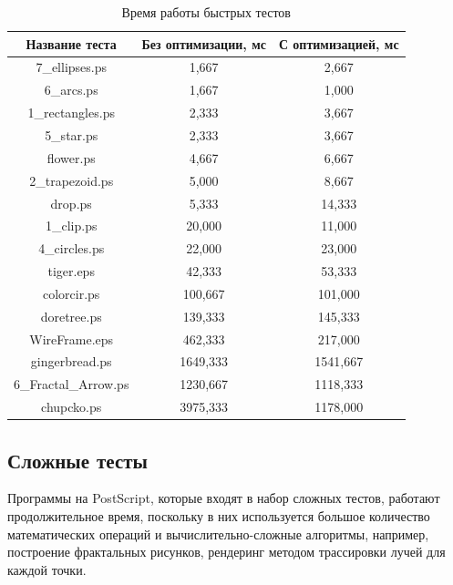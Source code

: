 \documentclass[14pt]{extarticle}
\begin{document}
\begin{table}[H]
	\small
	\begin{center}
	\begin{tabular}{|c|c|c|}
		\hline \textbf{Название теста} & \textbf{Без оптимизации, мс} & \textbf{С оптимизацией, мс}\\
		\hline 7\_ellipses.ps & 1,667 &  2,667\\
		\hline 6\_arcs.ps & 1,667 & 1,000\\
		\hline 1\_rectangles.ps & 2,333 & 3,667\\
		\hline 5\_star.ps &  2,333 & 3,667\\
		\hline flower.ps & 4,667 & 6,667\\
		\hline 2\_trapezoid.ps & 5,000 & 8,667\\
		\hline drop.ps & 5,333 & 14,333\\
		\hline 1\_clip.ps & 20,000 & 11,000\\
		\hline 4\_circles.ps & 22,000 & 23,000\\
		\hline tiger.eps & 42,333 & 53,333\\
		\hline colorcir.ps & 100,667 & 101,000\\
		\hline doretree.ps & 139,333 & 145,333\\
		\hline WireFrame.eps &  462,333 &  217,000\\
		\hline gingerbread.ps & 1649,333 & 1541,667\\
		\hline 6\_Fractal\_Arrow.ps &  1230,667 & 1118,333\\
		\hline chupcko.ps & 3975,333 &  1178,000\\
		\hline 					
	\end{tabular}
	\end{center}
	\caption{\label{tab:fast-tests}Время работы быстрых тестов}
\end{table}

\pagebreak
	\subsection*{Сложные тесты}
	Программы на PostScript, которые входят в набор сложных тестов, работают продолжительное время, поскольку в них используется большое количество математических операций и вычислительно-сложные алгоритмы, например, построение фрактальных рисунков, рендеринг методом трассировки лучей для каждой точки.
	
\end{document}
